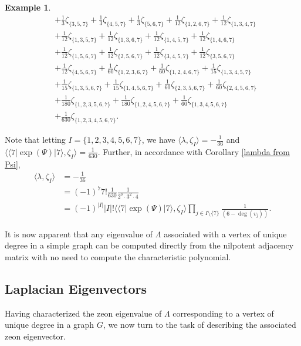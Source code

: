 \documentclass{article}
\theoremstyle{definition}
\newtheorem{example}[theorem]{Example}
\numberwithin{equation}{section}
\begin{document}
\begin{example}
\begin{align*}
&+\frac{1}{3} \zeta _{\{3,5,7\}}+\frac{1}{3} \zeta _{\{4,5,7\}}+\frac{1}{3} \zeta _{\{5,6,7\}}+\frac{1}{12} \zeta _{\{1,2,6,7\}}+\frac{1}{12} \zeta _{\{1,3,4,7\}}\\
&+\frac{1}{12} \zeta _{\{1,3,5,7\}}+\frac{1}{12} \zeta _{\{1,3,6,7\}}+\frac{1}{12} \zeta _{\{1,4,5,7\}}+\frac{1}{12} \zeta _{\{1,4,6,7\}}\\
&+\frac{1}{12} \zeta _{\{1,5,6,7\}}+\frac{1}{12} \zeta _{\{2,5,6,7\}}+\frac{1}{12} \zeta _{\{3,4,5,7\}}+\frac{1}{12} \zeta _{\{3,5,6,7\}}\\
&+\frac{1}{12} \zeta _{\{4,5,6,7\}}+\frac{1}{60} \zeta _{\{1,2,3,6,7\}}+\frac{1}{60} \zeta _{\{1,2,4,6,7\}}+\frac{1}{15} \zeta _{\{1,3,4,5,7\}}\\
&+\frac{1}{15} \zeta _{\{1,3,5,6,7\}}+\frac{1}{15} \zeta _{\{1,4,5,6,7\}}+\frac{1}{60} \zeta _{\{2,3,5,6,7\}}+\frac{1}{60} \zeta _{\{2,4,5,6,7\}}\\
&+\frac{1}{180} \zeta _{\{1,2,3,5,6,7\}}+\frac{1}{180} \zeta _{\{1,2,4,5,6,7\}}+\frac{1}{60} \zeta _{\{1,3,4,5,6,7\}}\\
&+\frac{1}{630} \zeta _{\{1,2,3,4,5,6,7\}}.
\end{align*}

Note that letting $I=\{1,2,3,4,5,6,7\}$, we have $\langle\lambda, \zeta_I\rangle=-\frac{1}{36}$ and $\langle\langle 7\vert \exp(\Psi)\vert 7\rangle,\zeta_{I}\rangle=\frac{1}{630}$.  Further, in accordance with Corollary \ref{lambda from Psi},  \begin{align*}
\langle \lambda, \zeta_{I}\rangle&=-\frac{1}{36}\\
&=(-1)^7 7!\frac{1}{630}\frac{1}{2^3\cdot3^2\cdot4}\\
&=(-1)^{|I|}|I|!\langle\langle 7\vert \exp(\Psi)\vert 7\rangle, \zeta_{I}\rangle\prod_{j\in I\setminus \{7\}}\frac{1}{(6-\deg(v_j))}.
\end{align*}

\end{example}

It is now apparent that any eigenvalue of $\Lambda$ associated with a vertex of unique degree in a simple graph can be computed directly from the nilpotent adjacency matrix with no need to compute the characteristic polynomial. 

\subsection{Laplacian Eigenvectors}

Having characterized the zeon eigenvalue of $\Lambda$ corresponding to a vertex of unique degree in a graph $G$, we now turn to the task of describing the associated zeon eigenvector. 
\end{document}
